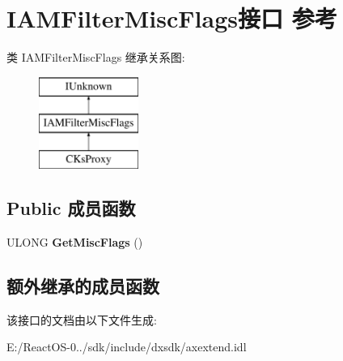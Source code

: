 \hypertarget{interface_i_a_m_filter_misc_flags}{}\section{I\+A\+M\+Filter\+Misc\+Flags接口 参考}
\label{interface_i_a_m_filter_misc_flags}
类 I\+A\+M\+Filter\+Misc\+Flags 继承关系图\+:\begin{figure}[H]
\begin{center}
\leavevmode
\includegraphics[height=3.000000cm]{interface_i_a_m_filter_misc_flags}
\end{center}
\end{figure}
\subsection*{Public 成员函数}
\begin{DoxyCompactItemize}
\item 
\mbox{\label{interface_i_a_m_filter_misc_flags_a2b79c393c5ad7c683bd6fbcff9ff2484}} 
U\+L\+O\+NG {\bfseries Get\+Misc\+Flags} ()
\end{DoxyCompactItemize}
\subsection*{额外继承的成员函数}


该接口的文档由以下文件生成\+:\begin{DoxyCompactItemize}
\item 
E\+:/\+React\+O\+S-\/0../sdk/include/dxsdk/axextend.\+idl\end{DoxyCompactItemize}
